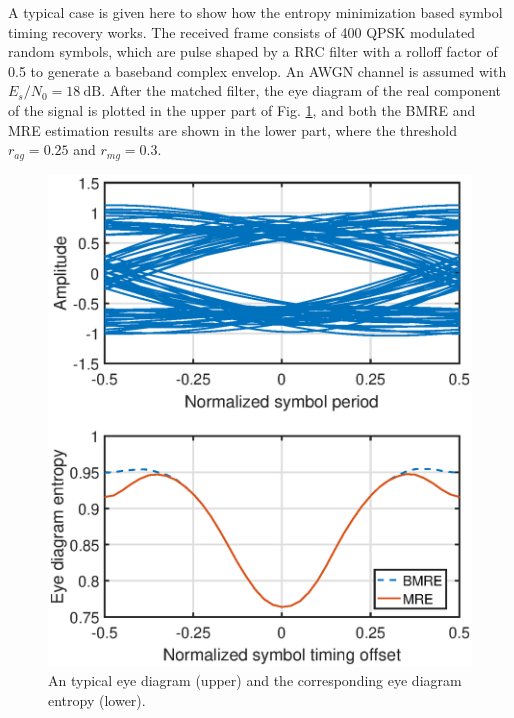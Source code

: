 \documentclass[journal,comsoc,onecolumn, 12pt,draftclsnofoot]{IEEEtran}
\begin{document}
A typical case is given here to show how the entropy minimization based symbol timing recovery works.
The received frame consists of 400 QPSK modulated random symbols, 
which are pulse shaped by a RRC filter with a rolloff factor of 0.5 to generate a baseband complex envelop.
An AWGN channel is assumed with $E_s/N_0 = 18~\text{dB}$. 
After the matched filter, the eye diagram of the real component of the signal is plotted in the upper part of Fig. \ref{fig:timing}, and both the BMRE and MRE estimation results are shown in the lower part,
where the threshold $r_{ag}=0.25$ and \(r_{mg}=0.3\).

\begin{figure}[htbp]
\centering
\includegraphics[width=3 in]{pic/timing.eps}
\caption{An typical eye diagram (upper) and the corresponding eye diagram entropy (lower).}
\label{fig:timing} 
\end{figure}
\end{document}
